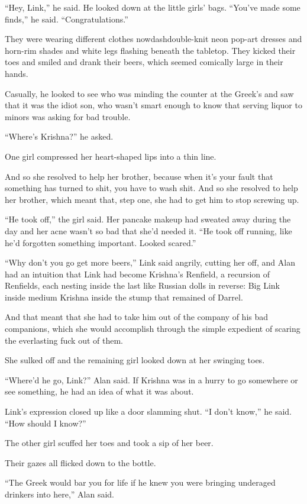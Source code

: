 ``Hey, Link,'' he said.  He looked down at the little girls' bags. 
``You've made some finds,'' he said.  ``Congratulations.''

They were wearing different clothes nowdash{}double-knit neon pop-art
dresses and horn-rim shades and white legs flashing beneath the
tabletop.  They kicked their toes and smiled and drank their beers,
which seemed comically large in their hands.

Casually, he looked to see who was minding the counter at the Greek's
and saw that it was the idiot son, who wasn't smart enough to know
that serving liquor to minors was asking for bad trouble.

``Where's Krishna?'' he asked.

One girl compressed her heart-shaped lips into a thin line.

And so she resolved to help her brother, because when it's your fault
that something has turned to shit, you have to wash shit.  And so she
resolved to help her brother, which meant that, step one, she had to
get him to stop screwing up.

``He took off,'' the girl said.  Her pancake makeup had sweated away
during the day and her acne wasn't so bad that she'd needed it.  ``He
took off running, like he'd forgotten something important.  Looked
scared.''

``Why don't you go get more beers,'' Link said angrily, cutting her
off, and Alan had an intuition that Link had become Krishna's
Renfield, a recursion of Renfields, each nesting inside the last like
Russian dolls in reverse:  Big Link inside medium Krishna inside the
stump that remained of Darrel.

And that meant that she had to take him out of the company of his bad
companions, which she would accomplish through the simple expedient of
scaring the everlasting fuck out of them.

She sulked off and the remaining girl looked down at her swinging
toes.

``Where'd he go, Link?'' Alan said.  If Krishna was in a hurry to go
somewhere or see something, he had an idea of what it was about.

Link's expression closed up like a door slamming shut.  ``I don't
know,'' he said.  ``How should I know?''

The other girl scuffed her toes and took a sip of her beer.

Their gazes all flicked down to the bottle.

``The Greek would bar you for life if he knew you were bringing
underaged drinkers into here,'' Alan said.

